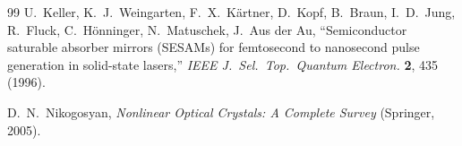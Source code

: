 \documentclass[11pt,a4paper]{article}
\begin{document}
\begin{thebibliography}{99}
U.~Keller, K.~J.~Weingarten, F.~X.~K\"artner, D.~Kopf, B.~Braun, I.~D.~Jung, R.~Fluck, C.~H\"onninger, N.~Matuschek, J.~Aus der Au,
``Semiconductor saturable absorber mirrors (SESAMs) for femtosecond to nanosecond pulse generation in solid-state lasers,''
\emph{IEEE J.~Sel.\ Top.\ Quantum Electron.} \textbf{2}, 435 (1996).

D.~N.~Nikogosyan, \emph{Nonlinear Optical Crystals: A Complete Survey} (Springer, 2005).

\end{thebibliography}
\end{document}
